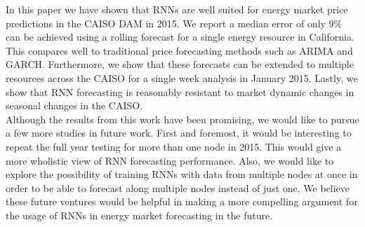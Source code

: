 \documentclass[sigconf]{acmart}
\begin{document}
In this paper we have shown that RNNs are well suited for energy market price predictions in the CAISO DAM in 2015. We report a median error of only 9\% can be achieved using a rolling forecast for a single energy resource in California. This compares well to traditional price forecasting methods such as ARIMA and GARCH. Furthermore, we show that these forecasts can be extended to multiple resources across the CAISO for a single week analysis in January 2015. Lastly, we show that RNN forecasting is reasonably resistant to market dynamic changes in seasonal changes in the CAISO.\\

Although the results from this work have been promising, we would like to pursue a few more studies in future work. First and foremost, it would be interesting to repeat the full year testing for more than one node in 2015. This would give a more wholistic view of RNN forecasting performance. Also, we would like to explore the possibility of training RNNs with data from multiple nodes at once in order to be able to forecast along multiple nodes instead of just one. We believe these future ventures would be helpful in making a more compelling argument for the usage of RNNs in energy market forecasting in the future.


%	
%



%

\end{document}
